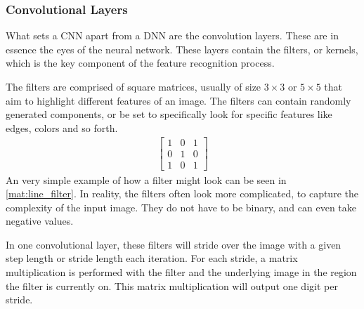 \documentclass[10pt, twocolumn]{article}
\begin{document}



\subsubsection{Convolutional Layers} %
\label{sec:theory_conv_layers}
What sets a CNN apart from a DNN are the convolution layers. These are in essence the eyes of the neural network.  These layers contain the filters, or kernels, which is the key component of the feature recognition process. 

The filters are comprised of square matrices, usually of size $3 \times 3$ or $5 \times 5$ that aim to highlight different features of an image. The filters can contain randomly generated components, or be set to specifically look for specific features like edges, colors and so forth.
\begin{align}\label{mat:line_filter}
\begin{bmatrix}
1 & 0 & 1\\
0 & 1 & 0\\
1 & 0 & 1
\end{bmatrix}
\end{align}
An very simple example of how a filter might look can be seen in \cref{mat:line_filter}. In reality, the filters often look more complicated, to capture the complexity of the input image. They do not have to be binary, and can even take negative values. 

In one convolutional layer, these filters will stride over the image with a given step length or stride length each iteration. For each stride, a matrix multiplication is performed with the filter and the underlying image in the region the filter is currently on. This matrix multiplication will output one digit per stride. 
\end{document}
